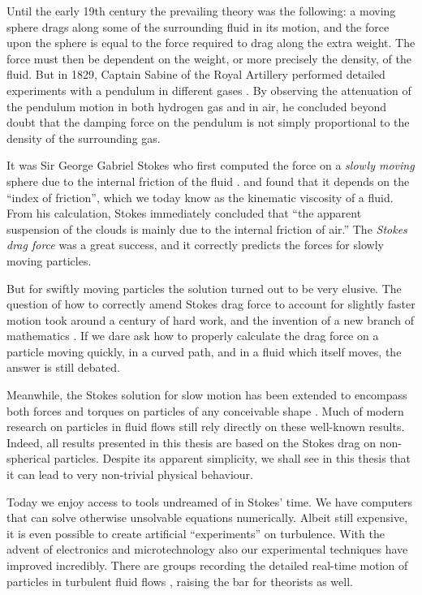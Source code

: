 \documentclass[thesis.tex]{subfiles}
\begin{document}
Until the early 19th century the prevailing theory was the following: a moving sphere drags along some of the surrounding fluid in its motion, and the force upon the sphere is equal to the force required to drag along the extra weight. The force must then be dependent on the weight, or more precisely the density, of the fluid. But in 1829, Captain Sabine of the Royal Artillery performed detailed experiments with a pendulum in different gases \cite{sabine1829}. By observing the attenuation of the pendulum motion in both hydrogen gas and in air, he concluded beyond doubt that the damping force on the pendulum is not simply proportional to the density of the surrounding gas.

It was Sir George Gabriel Stokes who first computed the force on a \emph{slowly moving
} sphere due to the internal friction of the fluid \cite{stokes1851}. and found that it depends on the ``index of friction'', which we today know as the kinematic viscosity of a fluid. From his calculation, Stokes immediately concluded that ``the apparent suspension of the clouds is mainly due to the internal friction of air.'' 
The \emph{Stokes drag force} was a great success, and it correctly predicts the forces for slowly moving particles.

But for swiftly moving particles
the solution turned out to be very elusive. The question of how to correctly amend Stokes drag force to account for slightly faster motion took around a century of hard work, and the invention of a new branch of mathematics \cite{goldenfeld2007}. If we dare ask how to properly calculate the drag force on a particle moving quickly, in a curved path, and in a fluid which itself moves, the answer is still debated.

Meanwhile, the Stokes solution for slow motion has been extended to encompass both forces and torques on particles of any conceivable shape \cite{jeffery1922,brenner1974,kim1991}. Much of modern research on particles in fluid flows still rely directly on these well-known results. Indeed, all results presented in this thesis are based on the Stokes drag on non-spherical particles. Despite its apparent simplicity, we shall see in this thesis that it can lead to very non-trivial physical behaviour.

Today we enjoy access to tools undreamed of in Stokes' time. We have computers that can solve otherwise unsolvable equations numerically. Albeit still expensive, it is even possible to create artificial ``experiments'' on turbulence. With the advent of electronics and microtechnology also our experimental techniques have improved incredibly. There are groups recording the detailed real-time motion of particles in turbulent fluid flows \cite{pumir2011,parsa2012}, raising the bar for theorists as well.
\end{document}
